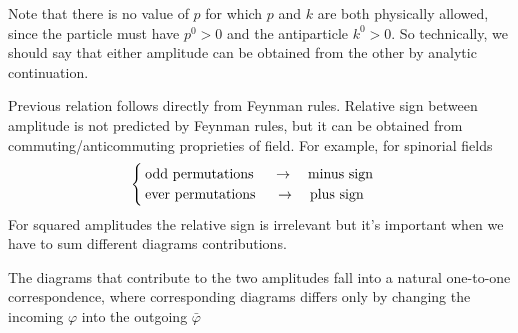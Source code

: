 \documentclass[TheoreticalPhy_ModB.tex]{subfiles}
\begin{document}
Note that there is no value of $p$ for which $p$ and $k$ are both physically allowed, since the particle must have $p^0 > 0$ and the antiparticle $k^0 > 0$.
So technically, we should say that either amplitude can be obtained from the other by analytic continuation.

Previous relation follows directly from Feynman rules. Relative sign between amplitude is not predicted by Feynman rules, but it can be obtained from commuting/anticommuting proprieties of field. For example, for spinorial fields
\[
\begin{cases}
\textup{odd permutations }\quad \to \quad \textup{minus sign}\\
\textup{ever permutations }\quad \to \quad \textup{plus sign}
\end{cases}
\]
For squared amplitudes the relative sign is irrelevant but it's important when we have to sum different diagrams contributions.

The diagrams that contribute to the two amplitudes fall into a natural one-to-one correspondence, where corresponding diagrams differs only by changing the incoming $\varphi$ into the outgoing $\bar{\varphi}$\\
\begin{center}

\end{center}
\end{document}

